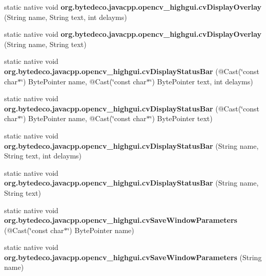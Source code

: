 \begin{DoxyCompactItemize}
static native void {\bfseries org.\+bytedeco.\+javacpp.\+opencv\+\_\+highgui.\+cv\+Display\+Overlay} (String name, String text, int delayms)
\item 
\mbox{\label{group__highgui__c_ga0cbee73ab5e6cb1201751f09c27f4425}} 
static native void {\bfseries org.\+bytedeco.\+javacpp.\+opencv\+\_\+highgui.\+cv\+Display\+Overlay} (String name, String text)
\item 
\mbox{\label{group__highgui__c_ga50a2713aef8af8f068cb8eca970b70dc}} 
static native void {\bfseries org.\+bytedeco.\+javacpp.\+opencv\+\_\+highgui.\+cv\+Display\+Status\+Bar} (@Cast(\char`\"{}const char$\ast$\char`\"{}) Byte\+Pointer name, @Cast(\char`\"{}const char$\ast$\char`\"{}) Byte\+Pointer text, int delayms)
\item 
\mbox{\label{group__highgui__c_ga38e4ec523798943980fb7e846dd2cb3c}} 
static native void {\bfseries org.\+bytedeco.\+javacpp.\+opencv\+\_\+highgui.\+cv\+Display\+Status\+Bar} (@Cast(\char`\"{}const char$\ast$\char`\"{}) Byte\+Pointer name, @Cast(\char`\"{}const char$\ast$\char`\"{}) Byte\+Pointer text)
\item 
\mbox{\label{group__highgui__c_ga19067247a51582fb4e0cfd10b1d5c00e}} 
static native void {\bfseries org.\+bytedeco.\+javacpp.\+opencv\+\_\+highgui.\+cv\+Display\+Status\+Bar} (String name, String text, int delayms)
\item 
\mbox{\label{group__highgui__c_ga9a04abd228f7bf050ea9dcbb7d201c5d}} 
static native void {\bfseries org.\+bytedeco.\+javacpp.\+opencv\+\_\+highgui.\+cv\+Display\+Status\+Bar} (String name, String text)
\item 
\mbox{\label{group__highgui__c_ga6ffe6d97cbb163618282ae962afddd6d}} 
static native void {\bfseries org.\+bytedeco.\+javacpp.\+opencv\+\_\+highgui.\+cv\+Save\+Window\+Parameters} (@Cast(\char`\"{}const char$\ast$\char`\"{}) Byte\+Pointer name)
\item 
\mbox{\label{group__highgui__c_gac0a9166d69af844c45b06ed4dcaeae23}} 
static native void {\bfseries org.\+bytedeco.\+javacpp.\+opencv\+\_\+highgui.\+cv\+Save\+Window\+Parameters} (String name)
\item 

\end{DoxyCompactItemize}
